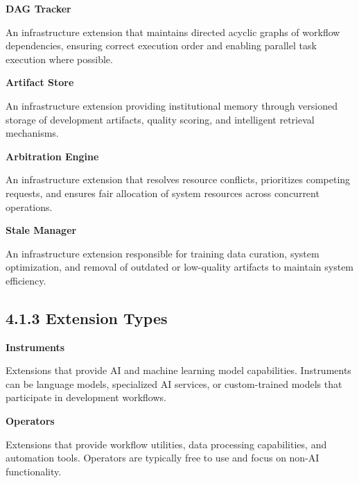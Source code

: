 \noindent\textbf{DAG Tracker}

An infrastructure extension that maintains directed acyclic graphs of workflow dependencies, ensuring correct execution order and enabling parallel task execution where possible.

\vspace{0.3cm}

\noindent\textbf{Artifact Store}

An infrastructure extension providing institutional memory through versioned storage of development artifacts, quality scoring, and intelligent retrieval mechanisms.

\vspace{0.3cm}

\noindent\textbf{Arbitration Engine}

An infrastructure extension that resolves resource conflicts, prioritizes competing requests, and ensures fair allocation of system resources across concurrent operations.

\vspace{0.3cm}

\noindent\textbf{Stale Manager}

An infrastructure extension responsible for training data curation, system optimization, and removal of outdated or low-quality artifacts to maintain system efficiency.

\subsection*{4.1.3 Extension Types}

\vspace{0.3cm}

\noindent\textbf{Instruments}

Extensions that provide AI and machine learning model capabilities. Instruments can be language models, specialized AI services, or custom-trained models that participate in development workflows.

\vspace{0.3cm}

\noindent\textbf{Operators}

Extensions that provide workflow utilities, data processing capabilities, and automation tools. Operators are typically free to use and focus on non-AI functionality.

\vspace{0.3cm}

